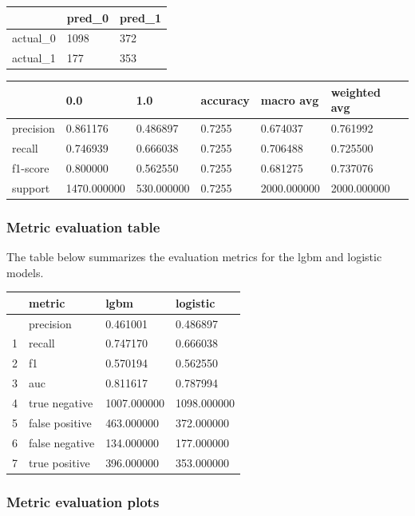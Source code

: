 \documentclass[
  letterpaper,
  DIV=11,
  numbers=noendperiod]{scrartcl}
\begin{document}
\begin{longtable}[]{@{}lll@{}}
\toprule\noalign{}
& pred\_0 & pred\_1 \\
\midrule\noalign{}
\endhead
\bottomrule\noalign{}
\endlastfoot
actual\_0 & 1098 & 372 \\
actual\_1 & 177 & 353 \\
\end{longtable}

\begin{longtable}[]{@{}llllll@{}}
\toprule\noalign{}
& 0.0 & 1.0 & accuracy & macro avg & weighted avg \\
\midrule\noalign{}
\endhead
\bottomrule\noalign{}
\endlastfoot
precision & 0.861176 & 0.486897 & 0.7255 & 0.674037 & 0.761992 \\
recall & 0.746939 & 0.666038 & 0.7255 & 0.706488 & 0.725500 \\
f1-score & 0.800000 & 0.562550 & 0.7255 & 0.681275 & 0.737076 \\
support & 1470.000000 & 530.000000 & 0.7255 & 2000.000000 &
2000.000000 \\
\end{longtable}

\subsubsection{Metric evaluation table}\label{metric-evaluation-table}

The table below summarizes the evaluation metrics for the lgbm and
logistic models.

\begin{longtable}[]{@{}llll@{}}
\toprule\noalign{}
& metric & lgbm & logistic \\
\midrule\noalign{}
\endhead
\bottomrule\noalign{}
\endlastfoot
0 & precision & 0.461001 & 0.486897 \\
1 & recall & 0.747170 & 0.666038 \\
2 & f1 & 0.570194 & 0.562550 \\
3 & auc & 0.811617 & 0.787994 \\
4 & true negative & 1007.000000 & 1098.000000 \\
5 & false positive & 463.000000 & 372.000000 \\
6 & false negative & 134.000000 & 177.000000 \\
7 & true positive & 396.000000 & 353.000000 \\
\end{longtable}

\subsubsection{Metric evaluation plots}\label{metric-evaluation-plots}
\end{document}
